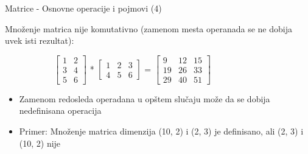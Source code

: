 \documentclass[bookmarks=true,bookmarksopen=true,pdfborder={0 0 0},pdfhighlight={/N},linkbordercolor={.5 .5 .5},implicit=false,unicode,xcolor={table}]{beamer}
\begin{document}
\begin{frame}{Matrice - Osnovne operacije i pojmovi (4)}

  Množenje matrica nije komutativno (zamenom mesta operanada se ne dobija uvek isti rezultat):
  \begin{figure}
    \begin{subfigure}{9cm}
      $\begin{bmatrix}
        1 & 2\\
        3 & 4\\
        5 & 6
        \end{bmatrix}$
      * 
      $\begin{bmatrix}
        1 & 2 & 3\\
        4 & 5 & 6
        \end{bmatrix}$
      =
      $\begin{bmatrix}
        9 & 12 & 15\\
        19 & 26 & 33\\
        29 & 40 & 51
        \end{bmatrix}$
    \end{subfigure}
  \end{figure}
  \begin{itemize}
    \item Zamenom redosleda operadana u opštem slučaju može da se dobija nedefinisana operacija
    \item Primer: Množenje matrica dimenzija (10, 2) i (2, 3) je definisano, ali (2, 3) i (10, 2) nije
  \end{itemize}

\end{frame}
\end{document}

